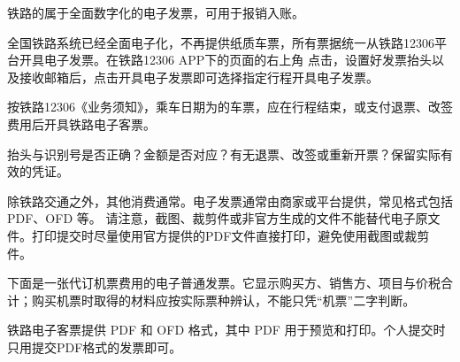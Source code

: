 \clearpage
{}
\label{invoices}
\begin{TeachingPair}
铁路的属于全面数字化的电子发票，可用于报销入账。


全国铁路系统已经全面电子化，不再提供纸质车票，所有票据统一从铁路12306平台开具电子发票。在铁路12306 APP下的页面的右上角
点击，设置好发票抬头以及接收邮箱后，点击开具电子发票即可选择指定行程开具电子发票。

按铁路12306《业务须知》，乘车日期为的车票，应在行程结束，或支付退票、改签费用后开具铁路电子客票。
\SideColumn
\begin{SideNote}
抬头与识别号是否正确？金额是否对应？有无退票、改签或重新开票？保留实际有效的凭证。

\end{SideNote}
\end{TeachingPair}
\vspace{2cm}
除铁路交通之外，其他消费通常。电子发票通常由商家或平台提供，常见格式包括 PDF、OFD 等。
请注意，截图、裁剪件或非官方生成的文件不能替代电子原文件。打印提交时尽量使用官方提供的PDF文件直接打印，避免使用截图或裁剪件。



\clearpage
下面是一张代订机票费用的电子普通发票。它显示购买方、销售方、项目与价税合计；购买机票时取得的材料应按实际票种辨认，不能只凭“机票”二字判断。


\begin{SummaryBox}
铁路电子客票提供 PDF 和 OFD 格式，其中 PDF 用于预览和打印。个人提交时只用提交PDF格式的发票即可。
\end{SummaryBox}

